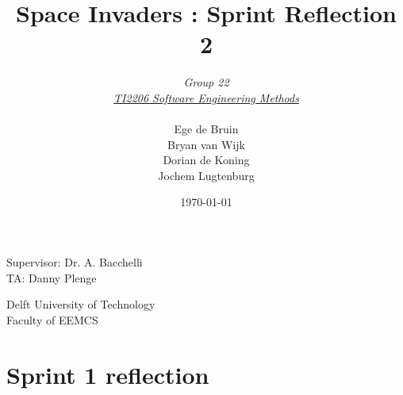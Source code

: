 \documentclass[10pt]{article}
\begin{document}
\title{Space Invaders : Sprint Reflection 2}
\date{\today}
\author{\textit{Group 22}\\ \textit{\underline{TI2206 Software Engineering Methods}} \\
 \\Ege de Bruin \\ Bryan van Wijk \\ Dorian de Koning \\ Jochem Lugtenburg }
 \maketitle  
 \begin{center}
Supervisor: Dr. A. Bacchelli\\
TA: Danny Plenge\\
 \end{center}     
 \begin{center}
 Delft University of Technology\\
 Faculty of EEMCS\\
 \end{center}
 \thispagestyle{empty}
 \pagebreak

\section*{Sprint 1 reflection}
\end{document}
